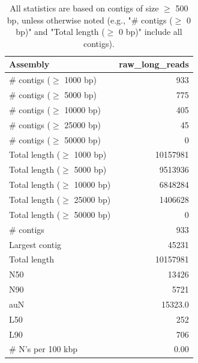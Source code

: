 \documentclass[12pt,a4paper]{article}
\begin{document}
\begin{table}[ht]
\begin{center}
\caption{All statistics are based on contigs of size $\geq$ 500 bp, unless otherwise noted (e.g., "\# contigs ($\geq$ 0 bp)" and "Total length ($\geq$ 0 bp)" include all contigs).}
\begin{tabular}{|l*{1}{|r}|}
\hline
Assembly & raw\_long\_reads \\ \hline
\# contigs ($\geq$ 1000 bp) & 933 \\ \hline
\# contigs ($\geq$ 5000 bp) & 775 \\ \hline
\# contigs ($\geq$ 10000 bp) & 405 \\ \hline
\# contigs ($\geq$ 25000 bp) & 45 \\ \hline
\# contigs ($\geq$ 50000 bp) & 0 \\ \hline
Total length ($\geq$ 1000 bp) & 10157981 \\ \hline
Total length ($\geq$ 5000 bp) & 9513936 \\ \hline
Total length ($\geq$ 10000 bp) & 6848284 \\ \hline
Total length ($\geq$ 25000 bp) & 1406628 \\ \hline
Total length ($\geq$ 50000 bp) & 0 \\ \hline
\# contigs & 933 \\ \hline
Largest contig & 45231 \\ \hline
Total length & 10157981 \\ \hline
N50 & 13426 \\ \hline
N90 & 5721 \\ \hline
auN & 15323.0 \\ \hline
L50 & 252 \\ \hline
L90 & 706 \\ \hline
\# N's per 100 kbp & 0.00 \\ \hline
\end{tabular}
\end{center}
\end{table}
\end{document}
